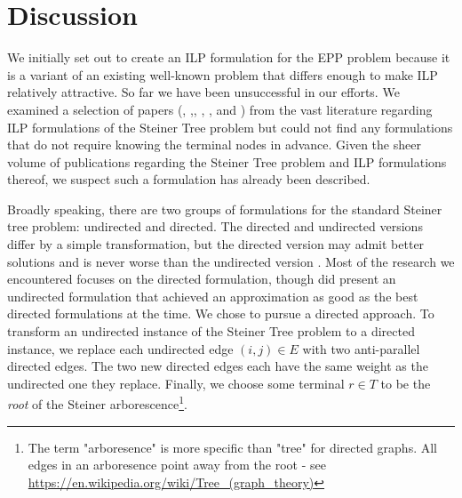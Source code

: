 \documentclass{article}
\begin{document}
 	\section{Discussion}
 	We initially set out to create an ILP formulation for the EPP problem because it is a variant of an existing well-known problem that differs enough to make ILP relatively attractive. So far we have been unsuccessful in our efforts.  We examined a selection of papers (\cite{Aneja1980AnIL}, \cite{Goemans1993ACO},\cite{Koch1998SolvingST}, \cite{Ljubic2005SolvingTP}, \cite{brandstater15}, and \cite{haouari2010strength}) from the vast literature regarding ILP formulations of the Steiner Tree problem but could not find any formulations that do not require knowing the terminal nodes in advance. Given the sheer volume of publications regarding the Steiner Tree problem and ILP formulations thereof, we suspect such a formulation has already been described.
 	
 	Broadly speaking, there are two groups of formulations for the standard Steiner tree problem: undirected and directed. The directed and undirected versions differ by a simple transformation, but the directed version may admit better solutions and is never worse than the undirected version \cite{rao1988steiner}. Most of the research we encountered focuses on the directed formulation, though \cite{Goemans1993ACO} did present an undirected formulation that achieved an approximation as good as the best directed formulations at the time. We chose to pursue a directed approach.
 	To transform an undirected instance of the Steiner Tree problem to a directed instance, we replace each undirected edge $(i,j) \in E$ with two anti-parallel directed edges. The two new directed edges each have the same weight as the undirected one they replace. Finally, we choose some terminal $r \in T$ to be the \textit{root} of the Steiner arborescence\footnote{The term "arboresence" is more specific than "tree" for directed graphs. All edges in an arboresence point away from the root - see \url{https://en.wikipedia.org/wiki/Tree_(graph_theory)}}. 
 	
\end{document}
